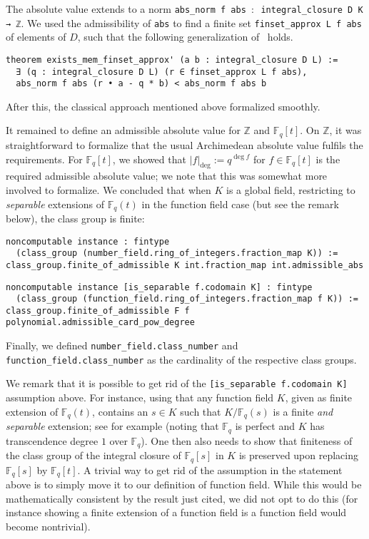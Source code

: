 \documentclass[a4paper,USenglish,cleveref, autoref, thm-restate]{lipics-v2021}
\newcommand{\lean}[1]{\texttt{#1}\xspace}
\newcommand*{\Fq}[1][q]{\mathbb{F}_{#1}}
\newcommand{\Z}{\mathbb{Z}}
\begin{document}
The absolute value extends to a norm \lean{abs\_norm f abs $:$ integral\_closure D K → ℤ}.
We used the admissibility of \lean{abs} to find a finite set \lean{finset\_approx L f abs} of elements of $D$,
such that the following generalization of~\cite[Theorem~12.2.1]{Ireland-Rosen} holds.
\begin{lstlisting}
theorem exists_mem_finset_approx' (a b : integral_closure D L) :=
  ∃ (q : integral_closure D L) (r ∈ finset_approx L f abs),
  abs_norm f abs (r • a - q * b) < abs_norm f abs b
\end{lstlisting}
After this, the classical approach mentioned above formalized smoothly.

It remained to define an admissible absolute value for $\Z$ and $\Fq[q][t]$. On $\Z$, it was straightforward to formalize that the usual Archimedean absolute value fulfils the requirements. For $\Fq[q][t]$, we showed that $\lvert f\rvert_{\deg}:=q^{\deg f}$ for $f \in \Fq[q][t]$ is the required admissible absolute value; we note that this was somewhat more involved to formalize.
We concluded that when $K$ is a global field, restricting to \emph{separable} extensions of $\Fq[q](t)$ in the function field case (but see the remark below), the class group is finite:
\begin{lstlisting}
noncomputable instance : fintype
  (class_group (number_field.ring_of_integers.fraction_map K)) :=
class_group.finite_of_admissible K int.fraction_map int.admissible_abs
\end{lstlisting} %
\begin{lstlisting}
noncomputable instance [is_separable f.codomain K] : fintype
  (class_group (function_field.ring_of_integers.fraction_map f K)) :=
class_group.finite_of_admissible F f polynomial.admissible_card_pow_degree
\end{lstlisting}

Finally, we defined \lean{number\_field.class\_number} and \lean{function\_field.class\_number} as the cardinality of the respective class groups.

We remark that it is possible to get rid of the \lean{[is\_separable f.codomain K]} assumption above. 
For instance, using that any function field $K$, given as finite extension of $\Fq[q](t)$, contains an $s \in K$ such that $K/\Fq[q](s)$ is a finite \emph{and separable} extension; see for example \cite[Corollary 4.4 in Chapter VIII]{Lang} (noting that $\Fq$ is perfect and $K$ has transcendence degree $1$ over $\Fq$).
One then also needs to show that finiteness of the class group of the integral closure of $\Fq[q][s]$ in $K$ is preserved upon replacing $\Fq[q][s]$ by $\Fq[q][t]$.
A trivial way to get rid of the assumption in the statement above is to simply move it to our definition of function field.
While this would be mathematically consistent by the result just cited, we did not opt to do this (for instance showing a finite extension of a function field is a function field
would become nontrivial).
\end{document}
